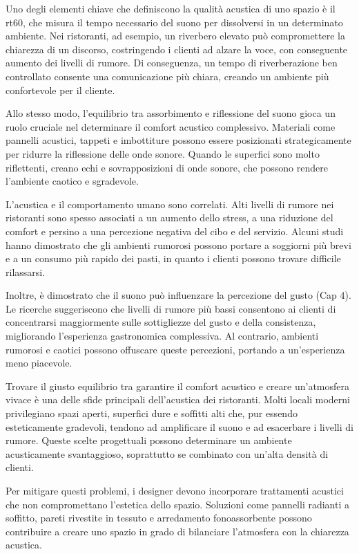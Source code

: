 Uno degli elementi chiave che definiscono la qualità acustica di uno spazio è il \gls{rt60}, che misura il tempo necessario del suono per dissolversi in un determinato ambiente. Nei ristoranti, ad esempio, un riverbero elevato può compromettere la chiarezza di un discorso, costringendo i clienti ad alzare la voce, con conseguente aumento dei livelli di rumore. Di conseguenza, un tempo di riverberazione ben controllato consente una comunicazione più chiara, creando un ambiente più confortevole per il cliente.

Allo stesso modo, l'equilibrio tra assorbimento e riflessione del suono gioca un ruolo cruciale nel determinare il comfort acustico complessivo. Materiali come pannelli acustici, tappeti e imbottiture possono essere posizionati strategicamente per ridurre la riflessione delle onde sonore. Quando le superfici sono molto riflettenti, creano echi e sovrapposizioni di onde sonore, che possono rendere l'ambiente caotico e sgradevole.

L'acustica e il comportamento umano sono correlati. Alti livelli di rumore nei ristoranti sono spesso associati a un aumento dello stress, a una riduzione del comfort e persino a una percezione negativa del cibo e del servizio. Alcuni studi hanno dimostrato che gli ambienti rumorosi possono portare a soggiorni più brevi e a un consumo più rapido dei pasti, in quanto i clienti possono trovare difficile rilassarsi.

Inoltre, è dimostrato che il suono può influenzare la percezione del gusto (Cap 4). Le ricerche suggeriscono che livelli di rumore più bassi consentono ai clienti di concentrarsi maggiormente sulle sottigliezze del gusto e della consistenza, migliorando l'esperienza gastronomica complessiva. Al contrario, ambienti rumorosi e caotici possono offuscare queste percezioni, portando a un'esperienza meno piacevole.

Trovare il giusto equilibrio tra garantire il comfort acustico e creare un'atmosfera vivace è una delle sfide principali dell'acustica dei ristoranti. Molti locali moderni privilegiano spazi aperti, superfici dure e soffitti alti che, pur essendo esteticamente gradevoli, tendono ad amplificare il suono e ad esacerbare i livelli di rumore. Queste scelte progettuali possono determinare un ambiente acusticamente svantaggioso, soprattutto se combinato con un'alta densità di clienti.

Per mitigare questi problemi, i designer devono incorporare trattamenti acustici che non compromettano l'estetica dello spazio. Soluzioni come pannelli radianti a soffitto, pareti rivestite in tessuto e arredamento fonoassorbente possono contribuire a creare uno spazio in grado di bilanciare l'atmosfera con la chiarezza acustica.~\cite{wiki:sound-restaurants}

